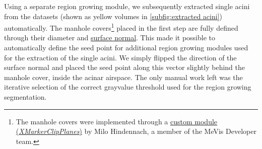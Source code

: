 \documentclass[%
	draft=false,
	paper=a4,%
	twoside=true,%
	draft=false,%
	abstract=false]{scrartcl}
\begin{document}
Using a separate region growing module, we subsequently extracted single acini from the datasets (shown as yellow volumes in \autoref{subfig:extracted acini}) automatically. The manhole covers\footnote{The manhole covers were implemented through a \href{http://www.mevis-research.de/cgi-bin/discus/board-auth.cgi?lm=1282233250&file=/839/11760.html}{custom module (\emph{XMarkerClipPlanes})} by Milo Hindennach, a member of the MeVis Developer team.} placed in the first step are fully defined through their diameter and \href{https://secure.wikimedia.org/wikipedia/en/w/index.php?title=Surface_normal&oldid=411684319}{surface normal}. This made it possible to automatically define the seed point for additional region growing modules used for the extraction of the single acini. We simply flipped the direction of the surface normal and placed the seed point along this vector slightly behind the manhole cover, inside the acinar airspace. The only manual work left was the iterative selection of the correct grayvalue threshold used for the region growing segmentation.
\end{document}
